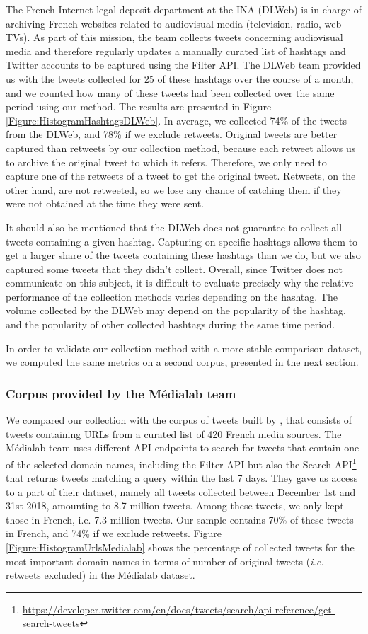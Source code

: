 The French Internet legal deposit department at the INA (DLWeb) is in charge of archiving French websites related to audiovisual media (television, radio, web TVs). As part of this mission, the team collects tweets concerning audiovisual media and therefore regularly updates a manually curated list of hashtags and Twitter accounts to be captured using the Filter API. The DLWeb team provided us with the tweets collected for 25 of these hashtags over the course of a month, and we counted how many of these tweets had been collected over the same period using our method. The results are presented in Figure \ref{Figure:HistogramHashtagsDLWeb}. In average, we collected 74\% of the tweets from the DLWeb, and 78\% if we exclude retweets. Original tweets are better captured than retweets by our collection method, because each retweet allows us to archive the original tweet to which it refers. Therefore, we only need to capture one of the retweets of a tweet to get the original tweet. Retweets, on the other hand, are not retweeted, so we lose any chance of catching them if they were not obtained at the time they were sent.

It should also be mentioned that the DLWeb does not guarantee to collect all tweets containing a given hashtag. Capturing on specific hashtags allows them to get a larger share of the tweets containing these hashtags than we do, but we also captured some tweets that they didn't collect. Overall, since Twitter does not communicate on this subject, it is difficult to evaluate precisely why the relative performance of the collection methods varies depending on the hashtag. The volume collected by the DLWeb may depend on the popularity of the hashtag, and the popularity of other collected hashtags during the same time period. 

In order to validate our collection method with a more stable comparison dataset, we computed the same metrics on a second corpus, presented in the next section.

\subsubsection{Corpus provided by the Médialab team}
We compared our collection with the corpus of tweets built by \citet{cardon2019unfolding}, that consists of
tweets containing URLs from a curated list of 420 French media sources. The Médialab team uses different API endpoints to search for tweets that contain one of the selected domain names, including the Filter API but also the Search API\footnote{\url{https://developer.twitter.com/en/docs/tweets/search/api-reference/get-search-tweets}} that returns tweets matching a query within the last 7 days. They gave us access to a part of their dataset, namely all tweets collected between December 1st and 31st 2018, amounting to 8.7 million tweets. Among these tweets, we only kept those in French, i.e. 7.3 million tweets. Our sample contains 70\% of these tweets in French, and 74\% if we exclude retweets. Figure \ref{Figure:HistogramUrlsMedialab} shows the percentage of collected tweets for the most important domain names in terms of number of original tweets (\textit{i.e.} retweets excluded) in the Médialab dataset.


